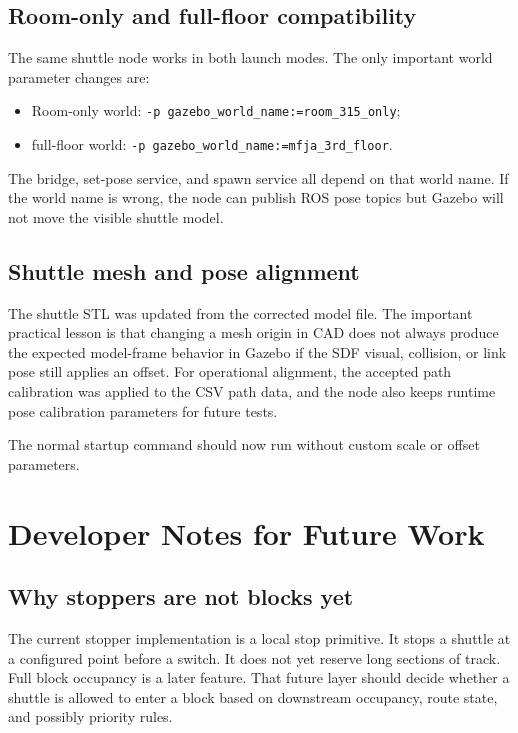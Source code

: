 \documentclass[12pt,a4paper]{report}
\begin{document}
\section{Room-only and full-floor compatibility}

The same shuttle node works in both launch modes. The only important world
parameter changes are:

\begin{itemize}
\item Room-only world: \texttt{-p gazebo\_world\_name:=room\_315\_only};
\item full-floor world: \texttt{-p gazebo\_world\_name:=mfja\_3rd\_floor}.
\end{itemize}

The bridge, set-pose service, and spawn service all depend on that world name.
If the world name is wrong, the node can publish ROS pose topics but Gazebo will
not move the visible shuttle model.

\section{Shuttle mesh and pose alignment}

The shuttle STL was updated from the corrected model file. The important
practical lesson is that changing a mesh origin in CAD does not always produce
the expected model-frame behavior in Gazebo if the SDF visual, collision, or
link pose still applies an offset. For operational alignment, the accepted path
calibration was applied to the CSV path data, and the node also keeps runtime
pose calibration parameters for future tests.

The normal startup command should now run without custom scale or offset
parameters.

\chapter{Developer Notes for Future Work}

\section{Why stoppers are not blocks yet}

The current stopper implementation is a local stop primitive. It stops a
shuttle at a configured point before a switch. It does not yet reserve long
sections of track. Full block occupancy is a later feature. That future layer
should decide whether a shuttle is allowed to enter a block based on downstream
occupancy, route state, and possibly priority rules.
\end{document}
